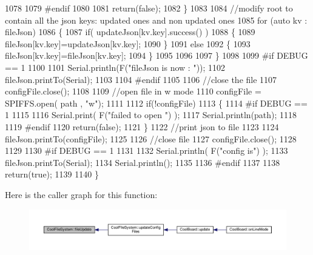 \begin{DoxyCode}
1078 
1079 \textcolor{preprocessor}{    #endif}
1080 
1081         \textcolor{keywordflow}{return}(\textcolor{keyword}{false});
1082     \}
1083     
1084     \textcolor{comment}{//modify root to contain all the json keys: updated ones and non updated ones}
1085     \textcolor{keywordflow}{for} (\textcolor{keyword}{auto} kv : fileJson) 
1086     \{
1087         \textcolor{keywordflow}{if}( updateJson[kv.key].success() )
1088         \{
1089             fileJson[kv.key]=updateJson[kv.key];            
1090         \}
1091         \textcolor{keywordflow}{else}
1092         \{
1093             fileJson[kv.key]=fileJson[kv.key];
1094         \}
1095 
1096                 
1097     \}
1098 
1099 \textcolor{preprocessor}{#if DEBUG == 1}
1100 
1101     Serial.println(F(\textcolor{stringliteral}{"fileJson is now : "}));
1102     fileJson.printTo(Serial);
1103 
1104 \textcolor{preprocessor}{#endif}
1105 
1106     \textcolor{comment}{//close the file}
1107     configFile.close();
1108 
1109     \textcolor{comment}{//open file in w mode}
1110     configFile = SPIFFS.open( path , \textcolor{stringliteral}{"w"});
1111     
1112     \textcolor{keywordflow}{if}(!configFile)
1113     \{   
1114 \textcolor{preprocessor}{    #if DEBUG == 1}
1115         
1116         Serial.print( F(\textcolor{stringliteral}{"failed to open "}) );
1117         Serial.println(path);
1118 
1119 \textcolor{preprocessor}{    #endif}
1120         \textcolor{keywordflow}{return}(\textcolor{keyword}{false});
1121     \}
1122     \textcolor{comment}{//print json to file    }
1123     
1124     fileJson.printTo(configFile);
1125     
1126     \textcolor{comment}{//close file}
1127     configFile.close();
1128 
1129 
1130 \textcolor{preprocessor}{#if DEBUG == 1}
1131 
1132     Serial.println( F(\textcolor{stringliteral}{"config is"}) );
1133     fileJson.printTo(Serial);
1134     Serial.println();
1135 
1136 \textcolor{preprocessor}{#endif}
1137     
1138     \textcolor{keywordflow}{return}(\textcolor{keyword}{true});
1139     
1140 \}
\end{DoxyCode}
Here is the caller graph for this function\+:\nopagebreak
\begin{figure}[H]
\begin{center}
\leavevmode
\includegraphics[width=350pt]{db/d0c/class_cool_file_system_a13f2958f5b87757c31fc53797a30d23a_icgraph}
\end{center}
\end{figure}
\mbox{\label{class_cool_file_system_a70701d05e811604af1b531f4f6dc69ed}} 
